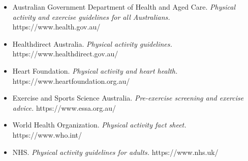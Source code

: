 \begin{itemize}
    \item Australian Government Department of Health and Aged Care. \textit{Physical activity and exercise guidelines for all Australians.} https://www.health.gov.au/
    \item Healthdirect Australia. \textit{Physical activity guidelines.} https://www.healthdirect.gov.au/
    \item Heart Foundation. \textit{Physical activity and heart health.} https://www.heartfoundation.org.au/
    \item Exercise and Sports Science Australia. \textit{Pre-exercise screening and exercise advice.} https://www.essa.org.au/
    \item World Health Organization. \textit{Physical activity fact sheet.} https://www.who.int/
    \item NHS. \textit{Physical activity guidelines for adults.} https://www.nhs.uk/
\end{itemize}
